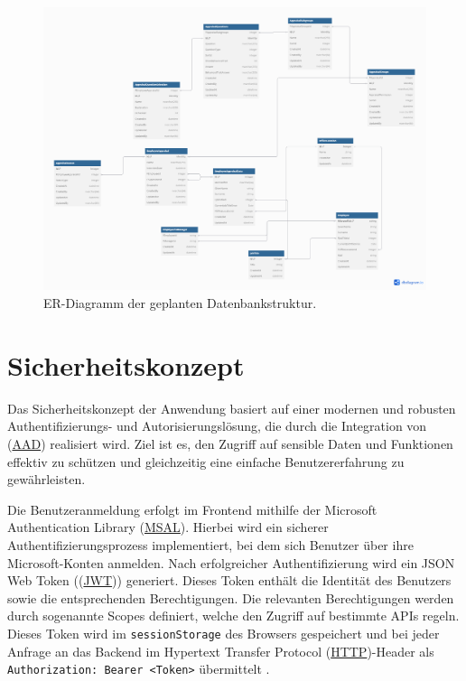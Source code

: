 \begin{figure}
    \centering
    \includegraphics[width=\textwidth]{images/er_modell_design.png}
    \caption{ER-Diagramm der geplanten Datenbankstruktur.}
    \label{fig:db_er_model}
\end{figure}

\newpage
\section{Sicherheitskonzept}

Das Sicherheitskonzept der Anwendung basiert auf einer modernen und robusten Authentifizierungs- und Autorisierungslösung, die durch die Integration von (\hyperref[abkuerzungen]{AAD}) realisiert wird. Ziel ist es, den Zugriff auf sensible Daten und Funktionen effektiv zu schützen und gleichzeitig eine einfache Benutzererfahrung zu gewährleisten.

Die Benutzeranmeldung erfolgt im Frontend mithilfe der Microsoft Authentication Library (\hyperref[abkuerzungen]{MSAL}). Hierbei wird ein sicherer Authentifizierungsprozess implementiert, bei dem sich Benutzer über ihre Microsoft-Konten anmelden. Nach erfolgreicher Authentifizierung wird ein JSON Web Token ((\hyperref[abkuerzungen]{JWT})) generiert. Dieses Token enthält die Identität des Benutzers sowie die entsprechenden Berechtigungen. Die relevanten Berechtigungen werden durch sogenannte Scopes definiert, welche den Zugriff auf bestimmte APIs regeln. Dieses Token wird im \texttt{sessionStorage} des Browsers gespeichert und bei jeder Anfrage an das Backend im Hypertext Transfer Protocol (\hyperref[abkuerzungen]{HTTP})-Header als \texttt{Authorization: Bearer <Token>} übermittelt \cite{msal2023}.

